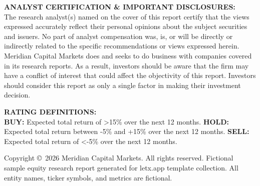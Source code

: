 \documentclass[10pt,a4paper]{scrartcl}
\begin{document}
{\color{TextMuted}\tiny
\textbf{ANALYST CERTIFICATION \& IMPORTANT DISCLOSURES:} \\
The research analyst(s) named on the cover of this report certify that the views expressed accurately reflect their personal opinions about the subject securities and issuers. No part of analyst compensation was, is, or will be directly or indirectly related to the specific recommendations or views expressed herein. Meridian Capital Markets does and seeks to do business with companies covered in its research reports. As a result, investors should be aware that the firm may have a conflict of interest that could affect the objectivity of this report. Investors should consider this report as only a single factor in making their investment decision.

\vspace{2pt}
\textbf{RATING DEFINITIONS:} \\
\textbf{BUY:} Expected total return of >15\% over the next 12 months. \textbf{HOLD:} Expected total return between -5\% and +15\% over the next 12 months. \textbf{SELL:} Expected total return of <-5\% over the next 12 months.

\vspace{2pt}
Copyright \copyright\ 2026 Meridian Capital Markets. All rights reserved. Fictional sample equity research report generated for letx.app template collection. All entity names, ticker symbols, and metrics are fictional.
}
\end{document}
